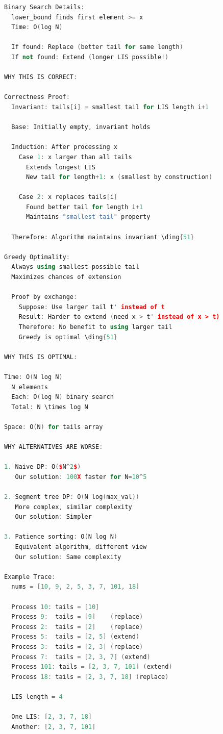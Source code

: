 \documentclass[11pt,a4paper,oneside]{book}
\begin{document}
\begin{lstlisting}[language=C++, caption=Complete LIS Solutions - NEW PROBLEMS]
Binary Search Details:
  lower_bound finds first element >= x
  Time: O(log N)
  
  If found: Replace (better tail for same length)
  If not found: Extend (longer LIS possible!)

WHY THIS IS CORRECT:

Correctness Proof:
  Invariant: tails[i] = smallest tail for LIS length i+1
  
  Base: Initially empty, invariant holds
  
  Induction: After processing x
    Case 1: x larger than all tails
      Extends longest LIS
      New tail for length+1: x (smallest by construction)
    
    Case 2: x replaces tails[i]
      Found better tail for length i+1
      Maintains "smallest tail" property
    
  Therefore: Algorithm maintains invariant \ding{51}

Greedy Optimality:
  Always using smallest possible tail
  Maximizes chances of extension
  
  Proof by exchange:
    Suppose: Use larger tail t' instead of t
    Result: Harder to extend (need x > t' instead of x > t)
    Therefore: No benefit to using larger tail
    Greedy is optimal \ding{51}

WHY THIS IS OPTIMAL:

Time: O(N log N)
  N elements
  Each: O(log N) binary search
  Total: N \times log N

Space: O(N) for tails array

WHY ALTERNATIVES ARE WORSE:

1. Naive DP: O($N^2$)
   Our solution: 100X faster for N=10^5

2. Segment tree DP: O(N log(max_val))
   More complex, similar complexity
   Our solution: Simpler

3. Patience sorting: O(N log N)
   Equivalent algorithm, different view
   Our solution: Same complexity

Example Trace:
  nums = [10, 9, 2, 5, 3, 7, 101, 18]
  
  Process 10: tails = [10]
  Process 9:  tails = [9]    (replace)
  Process 2:  tails = [2]    (replace)
  Process 5:  tails = [2, 5] (extend)
  Process 3:  tails = [2, 3] (replace)
  Process 7:  tails = [2, 3, 7] (extend)
  Process 101: tails = [2, 3, 7, 101] (extend)
  Process 18: tails = [2, 3, 7, 18] (replace)
  
  LIS length = 4
  
  One LIS: [2, 3, 7, 18]
  Another: [2, 3, 7, 101]


\end{lstlisting}
\end{document}
